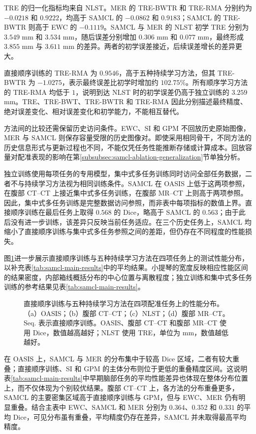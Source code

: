TRE 的归一化指标均来自 NLST。MER 的 TRE-BWTR 和 TRE-RMA 分别约为 $-0.0218$ 和 $0.9222$，均高于 SAMCL 的 $-0.0862$ 和 $0.9183$；SAMCL 的 TRE-BWTR 则高于 EWC 的 $-0.1119$。SAMCL 与 MER 的 NLST 初学 TRE 分别为 $3.549$ mm 和 $3.534$ mm，随后误差分别增加 $0.306$ mm 和 $0.077$ mm，最终形成 $3.855$ mm 与 $3.611$ mm 的差异。两者的初学误差接近，后续误差增长的差异更大。

直接顺序训练的 TRE-RMA 为 $0.9546$，高于五种持续学习方法，但其 TRE-BWTR 为 $-1.0275$，表示最终误差比初学时增加约 $102.75\%$。所有顺序学习方法的 TRE-RMA 均低于 $1$，说明到达 NLST 时的初学误差仍高于独立训练的 $3.259$ mm。TRE、TRE-BWT、TRE-BWTR 和 TRE-RMA 因此分别描述最终精度、绝对误差变化、相对误差变化和初学能力，不能相互替代。

方法间的比较还需保留历史访问条件。EWC、SI 和 GPM 不回放历史原始图像，MER 与 SAMCL 则保存容量受限的历史图像对。即使采用相同骨干，不同方法的历史信息形式与更新过程也不同，不能仅凭任务性能推断存储或计算成本。回放容量对配准表现的影响在第\ref{subsubsec:samcl-ablation-generalization}节单独分析。

独立训练使用每项任务的专用模型，集中式多任务训练同时访问全部任务数据，二者不与持续学习方法视为相同训练条件。SAMCL 在 OASIS 上低于这两项参照，在腹部 CT--CT 上接近集中式多任务训练，在腹部 MR--CT 上则高于两项参照。因此，集中式多任务训练是完整数据访问参照，而非表中每项指标的数值上界。直接顺序训练在最后任务上取得 $0.568$ 的 Dice，略高于 SAMCL 的 $0.563$；由于此后没有进一步训练，该差异只反映当前任务适应。在三个历史任务上，SAMCL 均缩小了直接顺序训练与集中式多任务参照之间的差距，但仍存在不同程度的性能损失。

图\ref{fig:samcl-performance-distributions}进一步展示直接顺序训练与五种持续学习方法在四项任务上的测试性能分布，以补充表\ref{tab:samcl-main-results}中的平均结果。小提琴的宽度反映相应性能区间的结果密度，内部箱线概括分布的中心位置与离散程度；独立训练和集中式多任务训练的参考结果见表\ref{tab:samcl-main-results}。

\begin{figure}[htbp]
\centering
{}
\caption[四项配准任务的性能分布]{直接顺序训练与五种持续学习方法在四项配准任务上的性能分布。（a）OASIS；（b）腹部 CT--CT；（c）NLST；（d）腹部 MR--CT。Seq. 表示直接顺序训练。OASIS、腹部 CT--CT 和腹部 MR--CT 使用 Dice，数值越高越好；NLST 使用 TRE，单位为 mm，数值越低越好。}
\label{fig:samcl-performance-distributions}
\end{figure}

在 OASIS 上，SAMCL 与 MER 的分布集中于较高 Dice 区域，二者有较大重叠；直接顺序训练、SI 和 GPM 的主体分布则位于更低的重叠精度区间。这说明表\ref{tab:samcl-main-results}中早期脑部任务的平均性能差异也体现在整体分布位置上，而不仅体现为个别较优结果。腹部 CT--CT 上，各方法的分布重叠更多，SAMCL 的主要密集区域高于直接顺序训练与 GPM，但与 EWC、MER 仍有明显重叠。结合主表中 EWC、SAMCL 和 MER 分别为 $0.364$、$0.352$ 和 $0.331$ 的平均 Dice，可见分布虽有重叠，平均精度仍存在差异，SAMCL 并未取得最高平均精度。

